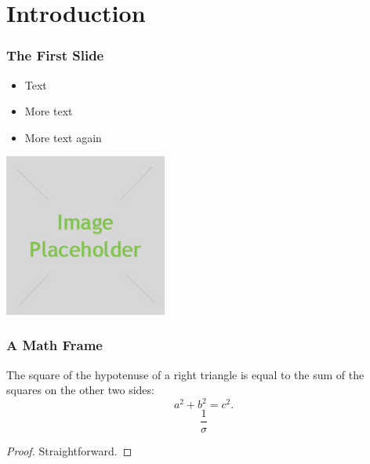 

\maketitle

\section{Introduction}

\begin{frame} 
\frametitle{The First Slide}
\begin{itemize}
 \item Text
 \item More text
 \item More text again
\end{itemize}
\begin{center}
  \includegraphics[width=0.4\textwidth]{images/placeholder.jpg}
\end{center}
\end{frame}


\begin{frame}
\frametitle{A Math Frame}
  \begin{theorem}[Pythagoras]
    The square of the hypotenuse of a \alert{right} triangle is equal to the sum of the squares on the other two sides:
    \[
    a^2 + b^2 = c^2.
    \]
    \[\frac{1}{\sigma}\]
  \end{theorem}
  \begin{proof}
    Straightforward.
  \end{proof}
\end{frame}

